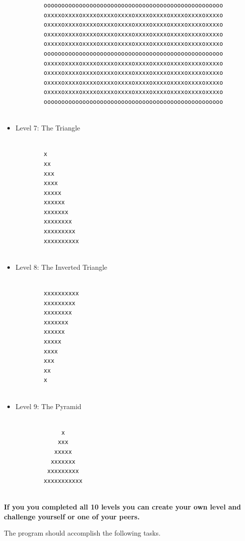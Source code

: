 \documentclass[12pt]{article}
\begin{document}
\begin{description}[labelindent=1cm]
\begin{itemize}
\begin{lstlisting}
		ooooooooooooooooooooooooooooooooooooooooooooooooooo
		oxxxxoxxxxoxxxxoxxxxoxxxxoxxxxoxxxxoxxxxoxxxxoxxxxo
		oxxxxoxxxxoxxxxoxxxxoxxxxoxxxxoxxxxoxxxxoxxxxoxxxxo
		oxxxxoxxxxoxxxxoxxxxoxxxxoxxxxoxxxxoxxxxoxxxxoxxxxo
		oxxxxoxxxxoxxxxoxxxxoxxxxoxxxxoxxxxoxxxxoxxxxoxxxxo
		ooooooooooooooooooooooooooooooooooooooooooooooooooo
		oxxxxoxxxxoxxxxoxxxxoxxxxoxxxxoxxxxoxxxxoxxxxoxxxxo
		oxxxxoxxxxoxxxxoxxxxoxxxxoxxxxoxxxxoxxxxoxxxxoxxxxo
		oxxxxoxxxxoxxxxoxxxxoxxxxoxxxxoxxxxoxxxxoxxxxoxxxxo
		oxxxxoxxxxoxxxxoxxxxoxxxxoxxxxoxxxxoxxxxoxxxxoxxxxo
		ooooooooooooooooooooooooooooooooooooooooooooooooooo
		
		\end{lstlisting}
		
	\newpage
		
		\item Level 7: The Triangle
		
		\begin{lstlisting}
		
		x
		xx
		xxx
		xxxx
		xxxxx
		xxxxxx
		xxxxxxx
		xxxxxxxx
		xxxxxxxxx
		xxxxxxxxxx
		
		\end{lstlisting}
		
		\item Level 8: The Inverted Triangle
		
		\begin{lstlisting}
		
		xxxxxxxxxx
		xxxxxxxxx
		xxxxxxxx
		xxxxxxx
		xxxxxx
		xxxxx
		xxxx
		xxx
		xx
		x
		
		\end{lstlisting}
		
		\item Level 9: The Pyramid
		
		\begin{lstlisting}
		
		     x 
		    xxx
		   xxxxx
		  xxxxxxx
		 xxxxxxxxx
		xxxxxxxxxxx
		
		\end{lstlisting}
		 
	\end{itemize}

	{\bf If you you completed all 10 levels you can create your own level and challenge yourself or one of your peers. }
	

\newpage
\item[\textbf{\underline{Program Minimum Requirements:}}] \hfill \vspace{0mm}

The program should accomplish the following tasks. 


\end{description}
\end{document}
